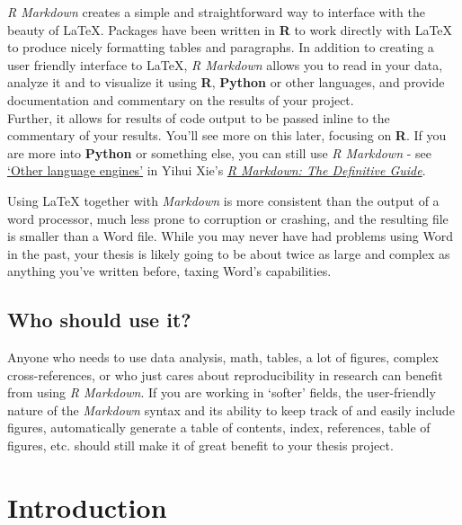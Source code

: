 \documentclass[a4paper, nobind]{templates/ociamthesis}
\begin{document}
\emph{R Markdown} creates a simple and straightforward way to interface with the beauty of LaTeX.
Packages have been written in \textbf{R} to work directly with LaTeX to produce nicely formatting tables and paragraphs.
In addition to creating a user friendly interface to LaTeX, \emph{R Markdown} allows you to read in your data, analyze it and to visualize it using \textbf{R}, \textbf{Python} or other languages, and provide documentation and commentary on the results of your project.\\
Further, it allows for results of code output to be passed inline to the commentary of your results.
You'll see more on this later, focusing on \textbf{R}. If you are more into \textbf{Python} or something else, you can still use \emph{R Markdown} - see \href{https://bookdown.org/yihui/rmarkdown/language-engines.html}{`Other language engines'} in Yihui Xie's \href{https://bookdown.org/yihui/rmarkdown/language-engines.html}{\emph{R Markdown: The Definitive Guide}}.

Using LaTeX together with \emph{Markdown} is more consistent than the output of a word processor, much less prone to corruption or crashing, and the resulting file is smaller than a Word file.
While you may never have had problems using Word in the past, your thesis is likely going to be about twice as large and complex as anything you've written before, taxing Word's capabilities.

\hypertarget{who-should-use-it}{%
\section*{Who should use it?}\label{who-should-use-it}}

Anyone who needs to use data analysis, math, tables, a lot of figures, complex cross-references, or who just cares about reproducibility in research can benefit from using \emph{R Markdown}.
If you are working in `softer' fields, the user-friendly nature of the \emph{Markdown} syntax and its ability to keep track of and easily include figures, automatically generate a table of contents, index, references, table of figures, etc. should still make it of great benefit to your thesis project.

\hypertarget{introduction-1}{%
\chapter{Introduction}\label{introduction-1}}
\end{document}
